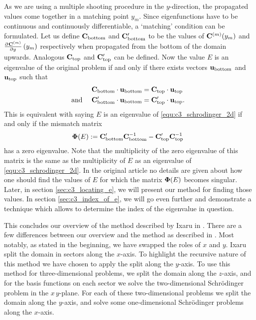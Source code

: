 As we are using a multiple shooting procedure in the $y$-direction, the propagated values come together in a matching point $y_m$. Since eigenfunctions have to be continuous and continuously differentiable, a `matching' condition can be formulated.  Let us define $\vb{C}_\text{bottom}$ and $\vb{C}_\text{bottom}'$ to be the values of $\vb{C}^{(m)}(y_m)$ and $\pdv[]{\vb{C}^{(m)}}{y}\left(y_m\right)$ respectively when propagated from the bottom of the domain upwards. Analogous $\vb{C}_\text{top}$ and $\vb{C}_\text{top}'$ can be defined. Now the value $E$ is an eigenvalue of the original problem if and only if there exists vectors $\vb{u}_\text{bottom}$ and $\vb{u}_\text{top}$ such that
\begin{align*}
    \vb{C}_\text{bottom} \cdot \vb{u}_\text{bottom}                   & = \vb{C}_\text{top} \cdot \vb{u}_\text{top}           \\
    \text{and }\quad \vb{C}_\text{bottom}' \cdot \vb{u}_\text{bottom} & = \vb{C}_\text{top}' \cdot \vb{u}_\text{top} \text{.}
\end{align*}
This is equivalent with saying $E$ is an eigenvalue of \eqref{equ:c3_schrodinger_2d} if and only if the mismatch matrix
\begin{equation}\label{equ:c3_psi_e}
    \vb{\Phi}(E) := \vb{C}_\text{bottom}'\vb{C}_\text{bottom}^{-1} - \vb{C}_\text{top}'\vb{C}_\text{top}^{-1}
\end{equation}
has a zero eigenvalue. Note that the multiplicity of the zero eigenvalue of this matrix is the same as the multiplicity of $E$ as an eigenvalue of \eqref{equ:c3_schrodinger_2d}. In the original article no details are given about how one should find the values of $E$ for which the matrix $\vb{\Phi}(E)$ becomes singular. Later, in section \ref{sec:c3_locating_e}, we will present our method for finding those values. In section \ref{sec:c3_index_of_e}, we will go even further and demonstrate a technique which allows to determine the index of the eigenvalue in question.

This concludes our overview of the method described by Ixaru in \cite{ixaru_new_2010}. There are a few differences between our overview and the method as described in \cite{ixaru_new_2010}. Most notably, as stated in the beginning, we have swapped the roles of $x$ and $y$. Ixaru split the domain in sectors along the $x$-axis. To highlight the recursive nature of this method we have chosen to apply the split along the $y$-axis. To use this method for three-dimensional problems, we split the domain along the $z$-axis, and for the basis functions on each sector we solve the two-dimensional Schrödinger problem in the $x\,y$-plane. For each of these two-dimensional problems we split the domain along the $y$-axis, and solve some one-dimensional Schrödinger problems along the $x$-axis.

